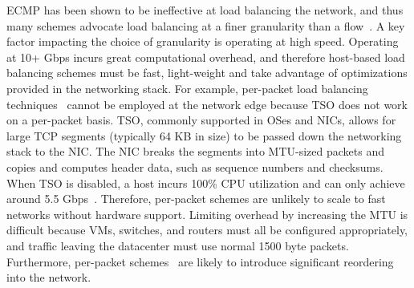  ECMP has been shown to be ineffective at load balancing the network, and thus many schemes advocate load balancing at a finer granularity than a flow~\cite{drb,conga,juniper-vcf,packetspray}. A key factor impacting the choice of granularity is operating at high speed. 
Operating at 10+ Gbps incurs great computational overhead, and therefore host-based load balancing schemes
must be fast, light-weight and take advantage of optimizations provided in the networking stack.
For example, per-packet load balancing techniques~\cite{drb} cannot be
employed at the network edge because TSO does not work on a per-packet
basis. TSO, commonly supported in OSes and NICs, allows for large TCP segments (typically 64 KB in size)
to be passed down the networking stack to the NIC. The NIC breaks the segments into MTU-sized packets and copies and computes
header data, such as sequence numbers and checksums. When TSO is disabled, a host incurs 100\% CPU utilization and can only achieve
around 5.5 Gbps~\cite{bullettrains}. Therefore, per-packet schemes are unlikely to scale to fast networks without hardware support.
Limiting overhead by increasing the MTU is difficult because
VMs, switches, and routers must all be configured appropriately, and traffic
leaving the datacenter must use normal 1500 byte packets. Furthermore, per-packet schemes~\cite{drb,packetspray} are likely to
introduce significant reordering into the network.



